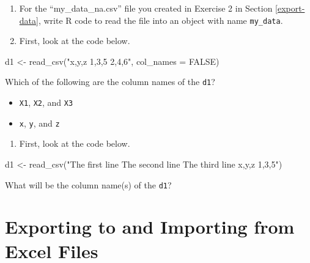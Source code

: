 \documentclass[
]{book}
\newenvironment{Shaded}{\begin{snugshade}}{\end{snugshade}}
\newcommand{\AttributeTok}[1]{\textcolor[rgb]{0.77,0.63,0.00}{#1}}
\newcommand{\ConstantTok}[1]{\textcolor[rgb]{0.00,0.00,0.00}{#1}}
\newcommand{\FunctionTok}[1]{\textcolor[rgb]{0.00,0.00,0.00}{#1}}
\newcommand{\NormalTok}[1]{#1}
\newcommand{\OtherTok}[1]{\textcolor[rgb]{0.56,0.35,0.01}{#1}}
\newcommand{\StringTok}[1]{\textcolor[rgb]{0.31,0.60,0.02}{#1}}
\providecommand{\tightlist}{%
  \setlength{\itemsep}{0pt}\setlength{\parskip}{0pt}}
\begin{document}
\begin{enumerate}
\def\labelenumi{\arabic{enumi}.}
\item
  For the ``my\_data\_na.csv'' file you created in Exercise 2 in Section \ref{export-data}, write R code to read the file into an object with name \texttt{my\_data}.
\item
  First, look at the code below.
\end{enumerate}

\begin{Shaded}
\begin{Highlighting}[]
\NormalTok{d1 }\OtherTok{\textless{}{-}} \FunctionTok{read\_csv}\NormalTok{(}\StringTok{"x,y,z}
\StringTok{          1,3,5}
\StringTok{          2,4,6"}\NormalTok{, }\AttributeTok{col\_names =} \ConstantTok{FALSE}\NormalTok{)}
\end{Highlighting}
\end{Shaded}

Which of the following are the column names of the \texttt{d1}?

\begin{itemize}
\tightlist
\item
  \texttt{X1}, \texttt{X2}, and \texttt{X3}
\item
  \texttt{x}, \texttt{y}, and \texttt{z}
\end{itemize}

\begin{enumerate}
\def\labelenumi{\arabic{enumi}.}
\setcounter{enumi}{2}
\tightlist
\item
  First, look at the code below.
\end{enumerate}

\begin{Shaded}
\begin{Highlighting}[]
\NormalTok{d1 }\OtherTok{\textless{}{-}} \FunctionTok{read\_csv}\NormalTok{(}\StringTok{"The first line }
\StringTok{          The second line}
\StringTok{          The third line}
\StringTok{          x,y,z}
\StringTok{          1,3,5"}\NormalTok{)}
\end{Highlighting}
\end{Shaded}

What will be the column name(s) of the \texttt{d1}?

\hypertarget{import-excel}{%
\section{Exporting to and Importing from Excel Files}\label{import-excel}}
\end{document}

